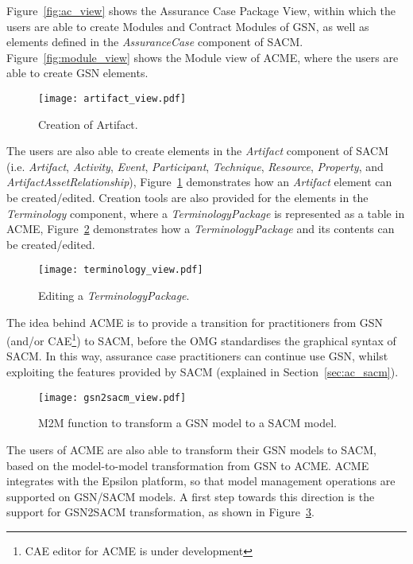 Figure~\ref{fig:ac_view} shows the Assurance Case Package View, within which the users are able to create Modules and Contract Modules of GSN, as well as elements defined in the \textit{AssuranceCase} component of SACM. 
Figure~\ref{fig:module_view} shows the Module view of ACME, where the users are able to create GSN elements. 

\begin{figure}
	\centering
	\texttt{[image: artifact\_view.pdf]}
	\caption{Creation of Artifact.}
	\label{fig:artifact_view}
\end{figure}

The users are also able to create elements in the \textit{Artifact} component of SACM (i.e. \textit{Artifact}, \textit{Activity}, \textit{Event}, \textit{Participant}, \textit{Technique}, \textit{Resource}, \textit{Property}, and \textit{ArtifactAssetRelationship}), Figure~\ref{fig:artifact_view} demonstrates how an \textit{Artifact} element can be created/edited. 
Creation tools are also provided for the elements in the \textit{Terminology} component, where a \textit{TerminologyPackage} is represented as a table in ACME, Figure~\ref{fig:terminology_view} demonstrates how a \textit{TerminologyPackage} and its contents can be created/edited.

\begin{figure}
	\centering
	\texttt{[image: terminology\_view.pdf]}
	\caption{Editing a \textit{TerminologyPackage}.}
	\label{fig:terminology_view}
\end{figure}

The idea behind ACME is to provide a transition for practitioners from GSN (and/or CAE\footnote{CAE editor for ACME is under development}) to SACM, before the OMG standardises the graphical syntax of SACM.
In this way, assurance case practitioners can continue use GSN, whilst exploiting the features provided by SACM (explained in Section~\ref{sec:ac_sacm}). 
\begin{figure}
	\centering
	\texttt{[image: gsn2sacm\_view.pdf]}
	\caption{M2M function to transform a GSN model to a SACM model.}
	\label{fig:transformation_view}
\end{figure}

The users of ACME are also able to transform their GSN models to SACM, based on the model-to-model transformation from GSN to ACME. 
ACME integrates with the Epsilon platform, so that model management operations are supported on GSN/SACM models. 
A first step towards this direction is the support for GSN2SACM transformation, as shown in Figure~\ref{fig:transformation_view}.

